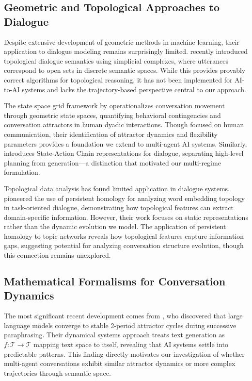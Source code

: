\documentclass[11pt,letterpaper]{article}
\begin{document}
\subsection{Geometric and Topological Approaches to Dialogue}

Despite extensive development of geometric methods in machine learning, their application to dialogue modeling remains surprisingly limited. \citep{ballus2024topological} recently introduced topological dialogue semantics using simplicial complexes, where utterances correspond to open sets in discrete semantic spaces. While this provides provably correct algorithms for topological reasoning, it has not been implemented for AI-to-AI systems and lacks the trajectory-based perspective central to our approach.

The state space grid framework by \citep{brinberg2024state} operationalizes conversation movement through geometric state spaces, quantifying behavioral contingencies and conversation attractors in human dyadic interactions. Though focused on human communication, their identification of attractor dynamics and flexibility parameters provides a foundation we extend to multi-agent AI systems. Similarly, \citep{sage2025steering} introduces State-Action Chain representations for dialogue, separating high-level planning from generation—a distinction that motivated our multi-regime formulation.

Topological data analysis has found limited application in dialogue systems. \citep{vukovic2022dialogue} pioneered the use of persistent homology for analyzing word embedding topology in task-oriented dialogue, demonstrating how topological features can extract domain-specific information. However, their work focuses on static representations rather than the dynamic evolution we model. The application of persistent homology to topic networks \citep{hopp2024persistent} reveals how topological features capture information gaps, suggesting potential for analyzing conversation structure evolution, though this connection remains unexplored.

\subsection{Mathematical Formalisms for Conversation Dynamics}

The most significant recent development comes from \citep{wang2025attractor}, who discovered that large language models converge to stable 2-period attractor cycles during successive paraphrasing. Their dynamical systems approach treats text generation as $f: \mathcal{T} \rightarrow \mathcal{T}$ mapping text space to itself, revealing that AI systems settle into predictable patterns. This finding directly motivates our investigation of whether multi-agent conversations exhibit similar attractor dynamics or more complex trajectories through semantic space.
\end{document}
